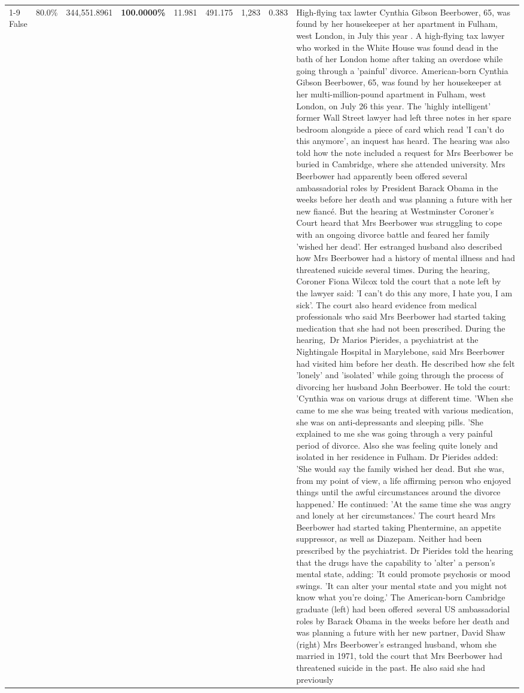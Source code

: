\begin{table}[H]
\begin{tabular}{lllrlllll}
\cline{1-9}
False & 80.0\% & 344,551.8961 & \bfseries \color{red} 100.0000\% & 11.981 & 491.175 & 1,283 & 0.383 & High-flying tax lawter Cynthia Gibson Beerbower, 65, was found by her housekeeper at her apartment in Fulham, west London, in July this year . A high-flying tax lawyer who worked in the White House was found dead in the bath of her London home after taking an overdose while going through a 'painful' divorce. American-born Cynthia Gibson Beerbower, 65, was found by her housekeeper at her multi-million-pound apartment in Fulham, west London, on July 26 this year. The 'highly intelligent' former Wall Street lawyer had left three notes in her spare bedroom alongside a piece of card which read 'I can't do this anymore', an inquest has heard. The hearing was also told how the note included a request for Mrs Beerbower be buried in Cambridge, where she attended university. Mrs Beerbower had apparently been offered several ambassadorial roles by President Barack Obama in the weeks before her death and was planning a future with her new fiancé. But the hearing at Westminster Coroner's Court heard that Mrs Beerbower was struggling to cope with an ongoing divorce battle and feared her family 'wished her dead'. Her estranged husband also described how Mrs Beerbower had a history of mental illness and had threatened suicide several times. During the hearing, Coroner Fiona Wilcox told the court that a note left by the lawyer said: 'I can't do this any more, I hate you, I am sick'. The court also heard evidence from medical professionals who said Mrs Beerbower had started taking medication that she had not been prescribed. During the hearing, Dr Marios Pierides, a psychiatrist at the Nightingale Hospital in Marylebone, said Mrs Beerbower had visited him before her death. He described how she felt 'lonely' and 'isolated' while going through the process of divorcing her husband John Beerbower. He told the court: 'Cynthia was on various drugs at different time. 'When she came to me she was being treated with various medication, she was on anti-depressants and sleeping pills. 'She explained to me she was going through a very painful period of divorce. Also she was feeling quite lonely and isolated in her residence in Fulham. Dr Pierides added: 'She would say the family wished her dead. But she was, from my point of view, a life affirming person who enjoyed things until the awful circumstances around the divorce happened.' He continued: 'At the same time she was angry and lonely at her circumstances.' The court heard Mrs Beerbower had started taking Phentermine, an appetite suppressor, as well as Diazepam. Neither had been prescribed by the psychiatrist. Dr Pierides told the hearing that the drugs have the capability to 'alter' a person's mental state, adding: 'It could promote psychosis or mood swings. 'It can alter your mental state and you might not know what you're doing.' The American-born Cambridge graduate (left) had been offered several US ambassadorial roles by Barack Obama in the weeks before her death and was planning a future with her new partner, David Shaw (right) Mrs Beerbower's estranged husband, whom she married in 1971, told the court that Mrs Beerbower had threatened suicide in the past. He also said she had previously 
\end{tabular}
\end{table}

